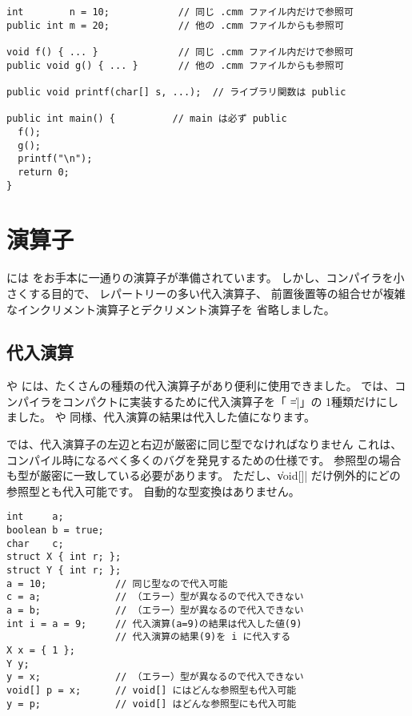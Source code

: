 \begin{mylist}
\begin{verbatim}
int        n = 10;            // 同じ .cmm ファイル内だけで参照可
public int m = 20;            // 他の .cmm ファイルからも参照可

void f() { ... }              // 同じ .cmm ファイル内だけで参照可
public void g() { ... }       // 他の .cmm ファイルからも参照可

public void printf(char[] s, ...);  // ライブラリ関数は public

public int main() {          // main は必ず public
  f();
  g();
  printf("\n");
  return 0;
}
\end{verbatim}
\end{mylist}

\section{演算子}

\cmml には \cl をお手本に一通りの演算子が準備されています。
しかし、コンパイラを小さくする目的で、
レパートリーの多い代入演算子、
前置後置等の組合せが複雑なインクリメント演算子とデクリメント演算子を
省略しました。

\subsection{代入演算}

\cl や \javal には、たくさんの種類の代入演算子があり便利に使用できました。
\cmml では、コンパイラをコンパクトに実装するために代入演算子を「 \|=|」の
1種類だけにしました。
\cl や \javal 同様、代入演算の結果は代入した値になります。

\cmml では、代入演算子の左辺と右辺が厳密に同じ型でなければなりません
これは、コンパイル時になるべく多くのバグを発見するための仕様です。
参照型の場合も型が厳密に一致している必要があります。
ただし、\|void[]| だけ例外的にどの参照型とも代入可能です。
自動的な型変換はありません。

\begin{mylist}
\begin{verbatim}
int     a;
boolean b = true;
char    c;
struct X { int r; };
struct Y { int r; };
a = 10;            // 同じ型なので代入可能
c = a;             // （エラー）型が異なるので代入できない
a = b;             // （エラー）型が異なるので代入できない
int i = a = 9;     // 代入演算(a=9)の結果は代入した値(9)
                   // 代入演算の結果(9)を i に代入する
X x = { 1 };
Y y;
y = x;             // （エラー）型が異なるので代入できない
void[] p = x;      // void[] にはどんな参照型も代入可能
y = p;             // void[] はどんな参照型にも代入可能
\end{verbatim}
\end{mylist}

